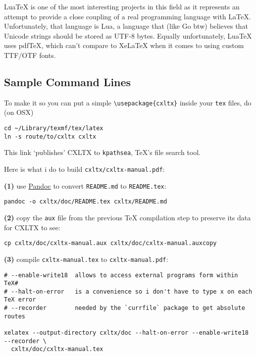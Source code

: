 LuaTeX is one of the most interesting projects in this field as it
represents an attempt to provide a close coupling of a real programming
language with LaTeX. Unfortunately, that language is Lua, a language
that (like Go btw) believes that Unicode strings should be stored as
UTF-8 bytes. Equally unfortunately, LuaTeX uses pdfTeX, which can't
compare to XeLaTeX when it comes to using custom TTF/OTF fonts.

\subsection{Sample Command Lines}\label{sample-command-lines}

To make it so you can put a simple
\texttt{\textbackslash{}usepackage\{cxltx\}} inside your \texttt{tex}
files, do (on OSX)

\begin{verbatim}
cd ~/Library/texmf/tex/latex
ln -s route/to/cxltx cxltx
\end{verbatim}

This link `publishes' CXLTX to \texttt{kpathsea}, TeX's file search
tool.

Here is what i do to build \texttt{cxltx/cxltx-manual.pdf}:

\textbf{(1)} use \href{http://http://johnmacfarlane.net/pandoc}{Pandoc}
to convert \texttt{README.md} to \texttt{README.tex}:

\begin{verbatim}
pandoc -o cxltx/doc/README.tex cxltx/README.md
\end{verbatim}

\textbf{(2)} copy the \texttt{aux} file from the previous TeX
compilation step to preserve its data for CXLTX to see:

\begin{verbatim}
cp cxltx/doc/cxltx-manual.aux cxltx/doc/cxltx-manual.auxcopy
\end{verbatim}

\textbf{(3)} compile \texttt{cxltx-manual.tex} to
\texttt{cxltx-manual.pdf}:

\begin{verbatim}
# --enable-write18  allows to access external programs form within TeX#
# --halt-on-error   is a convenience so i don't have to type x on each TeX error
# --recorder        needed by the `currfile` package to get absolute routes

xelatex --output-directory cxltx/doc --halt-on-error --enable-write18 --recorder \
  cxltx/doc/cxltx-manual.tex
\end{verbatim}

